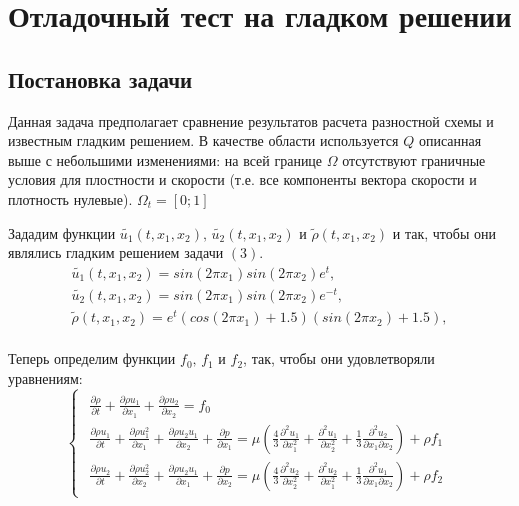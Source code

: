 \newpage
\section{Отладочный тест на гладком решении}
\subsection {Постановка задачи}

Данная задача предполагает сравнение результатов расчета разностной схемы и известным гладким решением. В качестве области используется $Q$ описанная выше с небольшими изменениями: на всей границе $\Omega$ отсутствуют граничные условия для плостности и скорости (т.е. все компоненты вектора скорости и плотность нулевые). $\Omega_t = [0;1]$

Зададим функции $\tilde{u_1}(t, x_1, x_2), \, \tilde{u_2}(t, x_1, x_2)$ и $\tilde{\rho}(t, x_1, x_2)$ и  так, чтобы они являлись гладким решением задачи $(3)$.
\begin{equation}
	\begin{array}{lc}
		\tilde{u_1}(t, x_1, x_2) = sin (2\pi x_1)sin(2\pi x_2) e^t,\\
		\tilde{u_2}(t, x_1, x_2) = sin (2\pi x_1)sin(2\pi x_2) e^{-t},\\
		\tilde{\rho}(t, x_1, x_2) = e^t (cos(2\pi x_1) + 1.5)(sin(2\pi x_2) + 1.5),\\
	\end{array}
\end{equation}

Теперь определим функции $f_0, \, f_1$ и $f_2$, так, чтобы они удовлетворяли уравнениям:
\begin{equation} \label{eq:task_reformulate}
	\begin{cases}
		\begin{array}{l}
			\frac{\partial \rho}{\partial t} + \frac{\partial \rho u_1}{\partial x_1} + \frac{\partial \rho u_2}{\partial x_2} = f_0 \\
			\frac{\partial \rho u_1}{\partial t} + \frac{\partial \rho u_1^2}{\partial x_1} + \frac{\partial \rho u_2 u_1}{\partial x_2} + \frac{\partial p}{\partial x_1} = \mu \left( \frac{4}{3} \frac{\partial^2 u_1}{\partial x_1^2} + \frac{\partial^2 u_1}{\partial x_2^2} + \frac{1}{3} \frac{\partial ^2 u_2}{\partial x_1 \partial x_2} \right) + \rho f_1 \\
			\frac{\partial \rho u_2}{\partial t} + \frac{\partial \rho u_2^2}{\partial x_2} + \frac{\partial \rho u_2 u_1}{\partial x_1} + \frac{\partial p}{\partial x_2} = \mu \left( \frac{4}{3} \frac{\partial^2 u_2}{\partial x_2^2} + \frac{\partial^2 u_2}{\partial x_1^2} + \frac{1}{3} \frac{\partial^2 u_1}{\partial x_1 \partial x_2} \right) + \rho f_2
		\end{array}
	\end{cases}
\end{equation}

